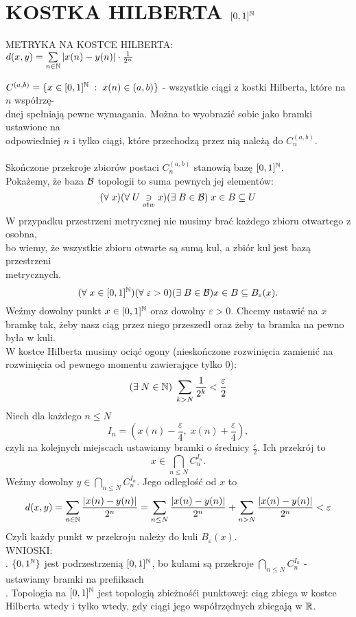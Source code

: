 \documentclass{article}
\begin{document}
\section{KOSTKA HILBERTA $[0,1]^{\mathbb{N}}$}
\begin{center}\large
    {\color{def}METRYKA NA KOSTCE HILBERTA:}\smallskip\\
    $d(x,y)=\sum\limits_{n\in\mathbb{N}}|x(n)-y(n)|\cdot\frac1{2^n}$
\end{center}\bigskip
$C^{(a,b)}=\{x\in[0,1]^{\mathbb{N}}\;:\;x(n)\in (a,b)\}$ - wszystkie ciągi z kostki Hilberta, które na $n$ współrzę-\\dnej spełniają pewne wymagania. Można to wyobrazić sobie jako bramki ustawione na \\odpowiedniej $n$ i tylko ciągi, które przechodzą przez nią należą do $C^{(a, b)}_n$.\bigskip\\
\bigskip\\
Skończone przekroje zbiorów postaci $C_n^{(a,b)}$ stanowią bazę $[0,1]^{\mathbb{N}}$.\medskip\\
\dowod
Pokażemy, że baza $\mathcal{B}$ topologii to suma pewnych jej elementów:
$$(\forall\;x)(\forall \;U\underset{otw}\ni x)(\exists\;B\in\mathcal{B})\;x\in B\subseteq U$$
W przypadku przestrzeni metrycznej nie musimy brać każdego zbioru otwartego z osobna, \\bo wiemy, że wszystkie zbioru otwarte są sumą kul, a zbiór kul jest bazą przestrzeni \\metrycznych.
$$(\forall\;x\in[0,1]^{\mathbb{N}})(\forall\;\varepsilon>0)(\exists\;B\in\mathcal{B})x\in B\subseteq B_\varepsilon (x).$$
Weźmy dowolny punkt $x\in[0, 1]^{\mathbb{N}}$ oraz dowolny $\varepsilon>0$. Chcemy ustawić na $x$ bramkę tak, żeby nasz ciąg przez niego przeszedł oraz żeby ta bramka na pewno była w kuli.\medskip\\
W kostce Hilberta musimy ociąć ogony (nieskończone rozwinięcia zamienić na rozwinięcia od pewnego momentu zawierające tylko 0):
$$(\exists\;N\in \mathbb{N})\;\sum\limits_{k>N}\frac1{2^k}<\frac\varepsilon2$$
Niech dla każdego $n\leq N$
$$I_n=(x(n)-\frac\varepsilon4,\; x(n)+\frac\varepsilon4),$$
czyli na kolejnych miejscach ustawiamy bramki o średnicy $\frac\varepsilon2$. Ich przekrój to
$$x\in\bigcap\limits_{n\leq N}C^{I_n}_n.$$
Weźmy dowolny $y\in \bigcap\limits_{n\leq N}C^{I_n}_n$. Jego odległość od $x$ to
$$d(x, y)=\sum\limits_{n\in\mathbb{N}}{|x(n)-y(n)|\over 2^n}=\sum\limits_{n\leq N}{|x(n)-y(n)|\over 2^n}+\sum\limits_{n>N}{|x(n)-y(n)|\over 2^n}<\varepsilon$$
Czyli każdy punkt w przekroju należy do kuli $B_\varepsilon(x)$.
\kondow
{}\bigskip\\
{\color{def}WNIOSKI:}\medskip\\
    . $\{0,1^{\mathbb{N}}\}$ jest podrzestrzenią $[0,1]^{\mathbb{N}}$, bo kulami są przekroje $\bigcap\limits_{n\leq N}C_n^{I_n}$ - ustawiamy bramki na prefiiksach\medskip\\
    . Topologia na $[0, 1]^{\mathbb{N}}$ jest topologią zbieżnośći punktowej: ciąg zbiega w kostce Hilberta wtedy i tylko wtedy, gdy ciągi jego współrzędnych zbiegają w $\mathbb{R}$.\bigskip\\
\end{document}
